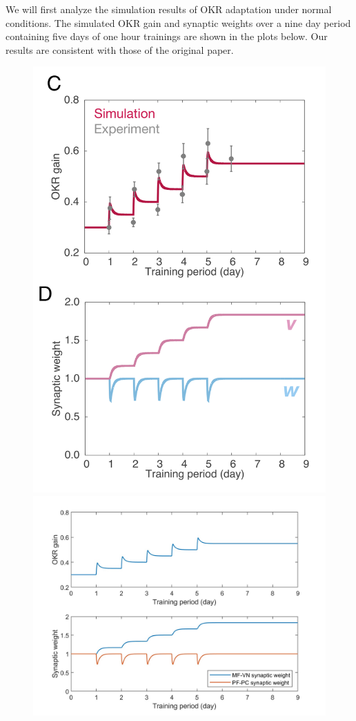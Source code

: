 \documentclass[10pt]{article}
\begin{document}
We will first analyze the simulation results of OKR adaptation under normal conditions. The simulated OKR gain and synaptic weights over a nine day period containing five days of one hour trainings are shown in the plots below. Our results are consistent with those of the original paper.

\begin{figure}[h]
    \centering
    \includegraphics[scale=0.58]{images/normal_operations_orig.png}
    \includegraphics[scale=0.18]{images/Fig1_rec.jpg}

\end{figure}
\end{document}
